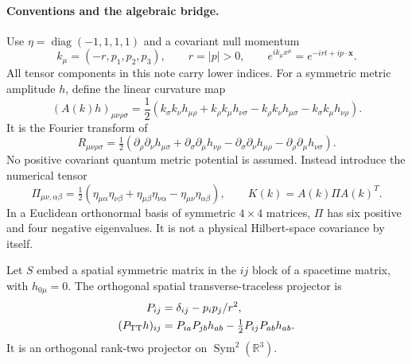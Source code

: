 \paragraph{Conventions and the algebraic bridge.}
Use $\eta=\operatorname{diag}(-1,1,1,1)$ and a covariant null momentum
\[
 k_\mu=(-r,p_1,p_2,p_3),\qquad r=|p|>0,
 \qquad e^{ik_\mu x^\mu}=e^{-irt+ip\cdot\mathbf x}.
\]
All tensor components in this note carry lower indices. For a symmetric
metric amplitude $h$, define the linear curvature map
\begin{equation}
 (A(k)h)_{\mu\nu\rho\sigma}
 =\frac12\left(k_\sigma k_\nu h_{\mu\rho}
 +k_\rho k_\mu h_{\nu\sigma}
 -k_\rho k_\nu h_{\mu\sigma}
 -k_\sigma k_\mu h_{\nu\rho}\right).
 \label{eq:toe-r7-covariant-A}
\end{equation}
It is the Fourier transform of
\[
 R_{\mu\nu\rho\sigma}
 =\tfrac12(\partial_\rho\partial_\nu h_{\mu\sigma}
 +\partial_\sigma\partial_\mu h_{\nu\rho}
 -\partial_\sigma\partial_\nu h_{\mu\rho}
 -\partial_\rho\partial_\mu h_{\nu\sigma}).
\]
No positive covariant quantum metric potential is assumed. Instead introduce
the numerical tensor
\begin{equation}
 \Pi_{\mu\nu,\alpha\beta}
 =\tfrac12(\eta_{\mu\alpha}\eta_{\nu\beta}
 +\eta_{\mu\beta}\eta_{\nu\alpha}
 -\eta_{\mu\nu}\eta_{\alpha\beta}),
 \qquad K(k)=A(k)\Pi A(k)^T.
 \label{eq:toe-r7-covariant-K}
\end{equation}
In a Euclidean orthonormal basis of symmetric $4\times4$ matrices, $\Pi$
has six positive and four negative eigenvalues. It is not a physical
Hilbert-space covariance by itself.

Let $S$ embed a spatial symmetric matrix in the $ij$ block of a spacetime
matrix, with $h_{0\mu}=0$. The orthogonal spatial transverse-traceless
projector is
\begin{align}
 P_{ij}&=\delta_{ij}-p_ip_j/r^2,\\
 (P_{\mathrm{TT}} h)_{ij}&=P_{ia}P_{jb}h_{ab}
       -\tfrac12 P_{ij}P_{ab}h_{ab}.
 \label{eq:toe-r7-covariant-PTT}
\end{align}
It is an orthogonal rank-two projector on $\operatorname{Sym}^2(\mathbb R^3)$.

